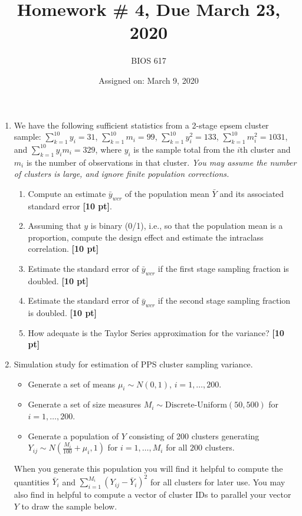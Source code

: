 \documentclass[12pt]{article}
\begin{document}
\title{Homework \# 4, Due March 23, 2020}
\author{BIOS 617}
\date{Assigned on: March 9, 2020}

\maketitle

\begin{enumerate}
\setlength{\itemsep}{15pt}%
\setlength{\parskip}{15pt}%

\item  We have the following sufficient statistics from a 2-stage epsem cluster sample: $\sum_{k=1}^{10} y_i = 31$, $\sum_{k=1}^{10} m_i = 99$, $\sum_{k=1}^{10} y_i^2 = 133$, $\sum_{k=1}^{10} m_i^2 = 1031$, and $\sum_{k=1}^{10} y_i m_i = 329$, where $y_i$ is the sample total from the $i$th cluster and $m_i$ is the number of observations in that cluster.  {\it You may assume the number of clusters is large, and ignore finite population corrections.}
	\begin{enumerate}[itemsep=5ex]
	\item Compute an estimate $\bar y_{wcr}$ of the population mean $\bar Y$ and its associated standard error {\bf [10 pt]}.
	\item Assuming that $y$ is binary (0/1), i.e., so that the population mean is a proportion, compute the design effect and estimate the intraclass correlation. {\bf [10 pt]}
	\item Estimate the standard error of $\bar y_{wcr}$ if the first stage sampling fraction is doubled. {\bf [10 pt]}
	\item Estimate the standard error of $\bar y_{wcr}$ if the second stage sampling fraction is doubled. {\bf [10 pt]}
	\item How adequate is the Taylor Series approximation for the variance? {\bf [10 pt]}
	\end{enumerate}
	\pagebreak

\item  Simulation study for estimation of PPS cluster sampling variance.
\begin{itemize}
\item Generate a set of means $\mu_i \sim N(0,1)$, $i=1,\ldots,200$.
\item Generate a set of size measures $M_i \sim \text{Discrete-Uniform} (50,500)$ for $i=1,\ldots,200$.
\item Generate a population of $Y$ consisting of 200 clusters generating $Y_{ij} \sim N \left( \frac{M_i}{100} + \mu_i, 1 \right)$ for $i=1,\ldots,M_i$ for all $200$ clusters.
\end{itemize}
When you generate this population you will find it helpful to compute the quantities $\bar Y_i$ and $\sum_{i=1}^{M_i} (Y_{ij} - \bar Y_i)^2$ for all clusters for later use.  You may also find in helpful to compute a vector of cluster IDs to parallel your vector $Y$ to draw the sample below.




\end{enumerate}
\end{document}

